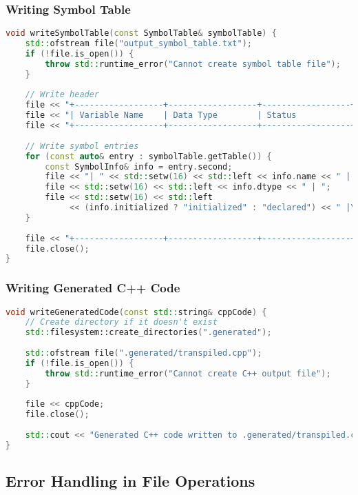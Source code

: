\documentclass[12pt,a4paper]{article}
\begin{document}
\subsubsection{Writing Symbol Table}

\begin{lstlisting}[language=C++, caption=Writing Symbol Table to File]
void writeSymbolTable(const SymbolTable& symbolTable) {
    std::ofstream file("output_symbol_table.txt");
    if (!file.is_open()) {
        throw std::runtime_error("Cannot create symbol table file");
    }
    
    // Write header
    file << "+------------------+------------------+------------------+\n";
    file << "| Variable Name    | Data Type        | Status           |\n";
    file << "+------------------+------------------+------------------+\n";
    
    // Write symbol entries
    for (const auto& entry : symbolTable.getTable()) {
        const SymbolInfo& info = entry.second;
        file << "| " << std::setw(16) << std::left << info.name << " | ";
        file << std::setw(16) << std::left << info.dtype << " | ";
        file << std::setw(16) << std::left 
             << (info.initialized ? "initialized" : "declared") << " |\n";
    }
    
    file << "+------------------+------------------+------------------+\n";
    file.close();
}
\end{lstlisting}

\subsubsection{Writing Generated C++ Code}

\begin{lstlisting}[language=C++, caption=Writing Transpiled C++ Code]
void writeGeneratedCode(const std::string& cppCode) {
    // Create directory if it doesn't exist
    std::filesystem::create_directories(".generated");
    
    std::ofstream file(".generated/transpiled.cpp");
    if (!file.is_open()) {
        throw std::runtime_error("Cannot create C++ output file");
    }
    
    file << cppCode;
    file.close();
    
    std::cout << "Generated C++ code written to .generated/transpiled.cpp\n";
}
\end{lstlisting}

\subsection{Error Handling in File Operations}
\end{document}
